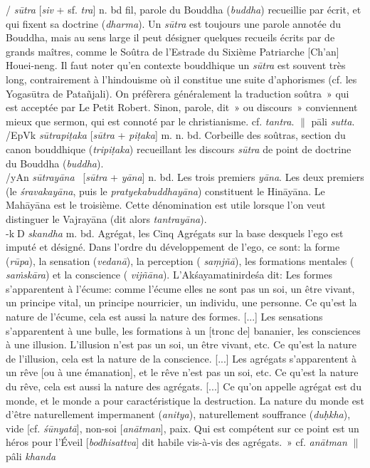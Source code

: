 \documentclass[a4paper,11pt,twocolumn]{article}
\begin{document}
{\dn {}/} {\em s\={u}tra} [{\em siv} + sf. {\em tra}] n. bd \og fil\fg,
parole du Bouddha ({\em buddha}) recueillie par écrit, et qui fixent sa
doctrine ({\em dharma}). Un {\em s\={u}tra} est toujours une parole annotée du
Bouddha, mais au sens large il peut désigner quelques recueils écrits
par de grands maîtres, comme le \og Soûtra de l'Estrade du Sixième
Patriarche [Ch'an] Houei-neng\fg. Il faut noter qu'en contexte bouddhique
un {\em s\={u}tra} est souvent très long, contrairement à
l'hindouisme où il constitue une suite d'aphorismes (cf. les Yogas\={u}tra de
Pata\~{n}jali). On préfèrera généralement la traduction \og soûtra~» qui
est acceptée par Le Petit Robert. Sinon, \og parole\fg, \og dit~» ou
\og discours~» conviennent mieux que \og sermon\fg, qui est connoté par le
christianisme. cf. {\em tantra}. $\|$ p\={a}li {\em sutta}. \\

{\dn {}/EpVk} {\em s\={u}trapi\d{t}aka} [{\em s\={u}tra} + {\em
pi\d{t}aka}] m. n. bd. \og Corbeille des soûtras\fg, section du canon
bouddhique ({\em tripi\d{t}aka}) recueillant les discours {\em
s\={u}tra} de point de doctrine du Bouddha ({\em buddha}). \\

{\dn {}/yAn} {\em s\={u}tray\={a}na} \ [{\em s\={u}tra} +
{\em y\={a}na}] n. bd. Les trois premiers {\em y\={a}na}. Les deux
premiers (le {\em \'{s}ravakay\={a}na},
puis le {\em pratyekabuddhay\={a}na}) constituent le
Hin\={a}y\={a}na. Le Mah\={a}y\={a}na est le troisième.
Cette dénomination est utile lorsque l'on veut distinguer le
Vajray\={a}na (dit alors {\em tantray\={a}na}). \\

{\dn -k^^FD} {\em skandha} m. bd. \og Agrégat\fg, les Cinq
Agrégats sur la base desquels l'ego est imputé et désigné. Dans
l'ordre du développement de l'ego, ce sont: la forme ({\em r\={u}pa}),
la sensation ({\em vedan\={a}}), la perception ({\em
sa\d{m}j\~{n}\={a}}), les formations mentales ({\em
sa\.{m}sk\={a}ra}) et la conscience ({\em
vij\~{n}\={a}na}). L'Ak\'{s}ayamatinirde\'{s}a dit: \og Les formes
s'apparentent à l'écume: comme l'écume elles ne sont
pas un soi, un être vivant, un principe vital, un principe nourricier,
un individu, une personne. Ce qu'est la nature de l'écume, cela est
aussi la nature des formes. [...] Les sensations s'apparentent à une
bulle, les formations à un [tronc de] bananier, les consciences à une
illusion. L'illusion n'est pas un soi, un être vivant, etc. Ce qu'est
la nature de l'illusion, cela est la nature de la conscience. [...]
Les agrégats s'apparentent à un rêve [ou à une émanation], et le rêve
n'est pas un soi, etc. Ce qu'est la nature du rêve, cela est aussi la
nature des agrégats. [...] Ce qu'on appelle agrégat est du monde, et
le monde a pour caractéristique la destruction. La nature du monde est
d'être naturellement impermanent ({\em anitya}), naturellement
souffrance ({\em du\d{h}kha}), vide  [cf. {\em \'{s}\={u}nyat\={a}}],
non-soi [{\em an\={a}tman}], paix. Qui est compétent sur ce point est
un héros pour l'Éveil [{\em bodhisattva}] dit habile vis-à-vis des
agrégats.~» cf. {\em an\={a}tman} $\|$ pâli {\em khanda} \\
\end{document}
